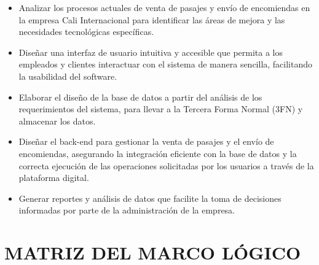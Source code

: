 \documentclass[12pt,letterpaper]{article}
\begin{document}
\begin{itemize}[label=$\bullet$, left=0cm, labelsep = 1.05cm, topsep = 0pt, parsep = 0pt]

	\item Analizar los procesos actuales de venta de pasajes y envío de encomiendas en la empresa Cali Internacional para identificar las áreas de mejora y las necesidades tecnológicas específicas.
	\item Diseñar una interfaz de usuario intuitiva y accesible que permita a los empleados y clientes interactuar con el sistema de manera sencilla, facilitando la usabilidad del software.
    \item Elaborar el diseño de la base de datos a partir del análisis de los requerimientos del sistema, para llevar a la Tercera Forma Normal (3FN) y almacenar los datos.
    \item Diseñar el back-end para gestionar la venta de pasajes y el envío de encomiendas, asegurando la integración eficiente con la base de datos y la correcta ejecución de las operaciones solicitadas por los usuarios a través de la plataforma digital.    
	\item Generar reportes y análisis de datos que facilite la toma de decisiones informadas por parte de la administración de la empresa.
    
\end{itemize}

\section{MATRIZ DEL MARCO LÓGICO}
\end{document}
